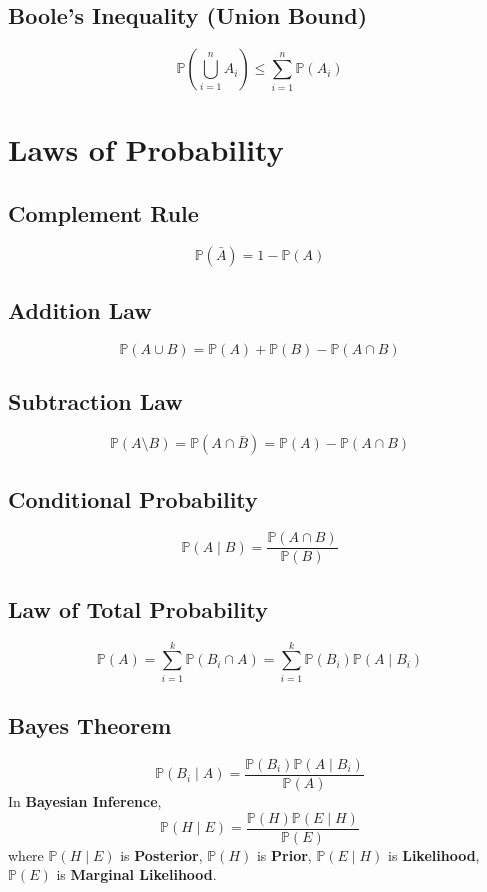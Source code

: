 \documentclass{article}
\begin{document}
\subsection{Boole's Inequality (Union Bound)}
\[
    \mathbb{P}\left(\bigcup_{i=1}^{n} A_i\right) \leq \sum_{i=1}^{n} \mathbb{P}(A_i)
\]

\newpage
\section{Laws of Probability}

\subsection{Complement Rule}
\[
    \mathbb{P}(\bar{A}) = 1 - \mathbb{P}(A)
\]

\subsection{Addition Law}
\[
    \mathbb{P}(A \cup B) = \mathbb{P}(A) + \mathbb{P}(B) - \mathbb{P}(A \cap B)
\]

\subsection{Subtraction Law}
\[
    \mathbb{P}(A \setminus B) = \mathbb{P}(A \cap \bar{B}) = \mathbb{P}(A) - \mathbb{P}(A \cap B)
\]

\subsection{Conditional Probability}
\[
    \mathbb{P}(A \mid B) = \frac{\mathbb{P}(A \cap B)}{\mathbb{P}(B)}
\]

\subsection{Law of Total Probability}
\[
    \mathbb{P}(A) = \sum_{i=1}^{k} \mathbb{P}(B_i \cap A) = \sum_{i=1}^{k} \mathbb{P}(B_i)\mathbb{P}(A \mid B_i)
\]

\subsection{Bayes Theorem}
\[
    \mathbb{P}(B_i \mid A) = \frac{\mathbb{P}(B_i)\mathbb{P}(A \mid B_i)}{\mathbb{P}(A)}
\]
In \textbf{Bayesian Inference},
\[
    \mathbb{P}(H \mid E) = \frac{\mathbb{P}(H)\mathbb{P}(E \mid H)}{\mathbb{P}(E)}
\]
where $\mathbb{P}(H \mid E)$ is \textbf{Posterior}, $\mathbb{P}(H)$ is \textbf{Prior}, $\mathbb{P}(E \mid H)$ is \textbf{Likelihood}, $\mathbb{P}(E)$ is \textbf{Marginal Likelihood}.
\end{document}
